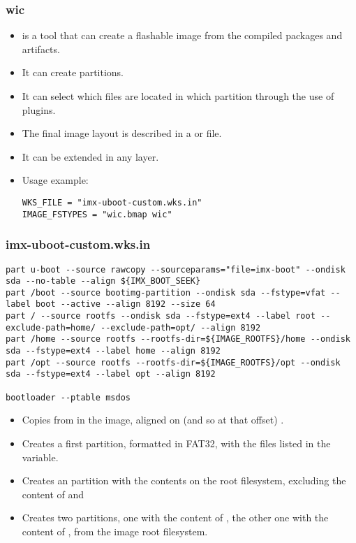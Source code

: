 \begin{frame}[fragile]
  \frametitle{wic}
  \begin{itemize}
    \item {} is a tool that can create a flashable image from
      the compiled packages and artifacts.
    \item It can create partitions.
    \item It can select which files are located in
      which partition through the use of plugins.
    \item The final image layout is described in a  or
       file.
    \item It can be extended in any layer.
    \item Usage example:
      \begin{block}{}
        \begin{verbatim}
WKS_FILE = "imx-uboot-custom.wks.in"
IMAGE_FSTYPES = "wic.bmap wic"
        \end{verbatim}
      \end{block}
  \end{itemize}
\end{frame}

\begin{frame}[fragile]
  \frametitle{imx-uboot-custom.wks.in}
      \begin{block}{}
        \fontsize{7}{7}\selectfont
        \begin{verbatim}
part u-boot --source rawcopy --sourceparams="file=imx-boot" --ondisk sda --no-table --align ${IMX_BOOT_SEEK}
part /boot --source bootimg-partition --ondisk sda --fstype=vfat --label boot --active --align 8192 --size 64
part / --source rootfs --ondisk sda --fstype=ext4 --label root --exclude-path=home/ --exclude-path=opt/ --align 8192
part /home --source rootfs --rootfs-dir=${IMAGE_ROOTFS}/home --ondisk sda --fstype=ext4 --label home --align 8192
part /opt --source rootfs --rootfs-dir=${IMAGE_ROOTFS}/opt --ondisk sda --fstype=ext4 --label opt --align 8192

bootloader --ptable msdos
        \end{verbatim}
      \end{block}
  \begin{itemize}
  \item Copies  from  in the image,
    aligned on (and so at that offset) .
  \item Creates a first partition, formatted in FAT32, with the files
    listed in the  variable.
  \item Creates an  partition with the contents on the root
    filesystem, excluding the content of  and 
  \item Creates two  partitions, one with the content of
    , the other one with the content of , from
    the image root filesystem.
  \end{itemize}
\end{frame}

